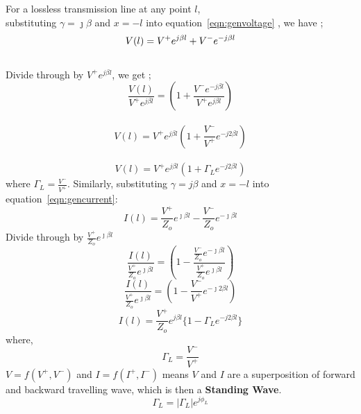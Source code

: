 For a lossless transmission line at any point $l$,\\
substituting $\gamma = \jmath\beta$ and $x=-l$ into equation~\ref{eqn:genvoltage} , we have ;
\begin{equation*}\\
V(l) = V^+ e^{j \beta l} + V^- e^{- j \beta l}
\end{equation*}\\
Divide through by $ V^+ e^{j \beta l}$, we get ;\\
\begin{equation*}
\frac{V(l)}{ V^+ e^{j \beta l}}= (1 +\frac{V^- e^{- j \beta l}}{V^+ e^{j \beta l}})
\end{equation*}\\
\begin{equation*}
V(l) = V^+ e^{j \beta l}(1+ \frac{V^-}{V^+}e^{-j 2 \beta l})
\end{equation*}\\
\begin{equation}
V(l) = V^+ e^{j \beta l}(1 + \Gamma_L e^{-j 2 \beta l})
\label{eqn:voltagefromload}
\end{equation}
where $\Gamma _L = \frac{V^-}{V^+}$. Similarly, substituting $\gamma = j\beta$ and $x = -l$ into equation~\ref{eqn:gencurrent}:
\begin{equation*}
I(l) = \frac{V^+}{Z_o}  e^{\jmath \beta l} - \frac{V^-}{Z_o} e^{-\jmath\beta l}
\end{equation*}
Divide through by $\frac{V^+}{Z_o}  e^{\jmath\beta l}$
\begin{equation*}
\frac{I(l)}{\frac{V^+}{Z_o}  e^{\jmath\beta l}} =( 1- \frac{\frac{V^-}{Z_o} e^{-\jmath\beta l}}{\frac{V^+}{Z_o}  e^{\jmath\beta l}} )
\end{equation*}
\begin{equation*}
\frac{I(l)}{\frac{V^+}{Z_o}  e^{\jmath\beta l}} =( 1-  \frac{V^-}{V^+}e^{-\jmath 2 \beta l})
\end{equation*}
\begin{equation}
I(l) = \frac{V^+}{Z_o}e ^{j \beta l}  \{ 1 - \Gamma_L e^{-j 2 \beta l}\}
\label{eqn:currentfromload}
\end{equation}
where,
\begin{equation*}
\Gamma _L = \frac{V^-}{V^+}
\end{equation*}
$V = f( V^{+}, V^{-})$ and $I = f(I^{+}, I^{-})$ means $V$ and $I$ are a superposition of forward and backward travelling wave, which is then a \textbf{Standing Wave}. 
\begin{equation}
\Gamma_L = |\Gamma_L|e^{j\phi_L}
\label{eqn:refcoefficientfromload}
\end{equation}
